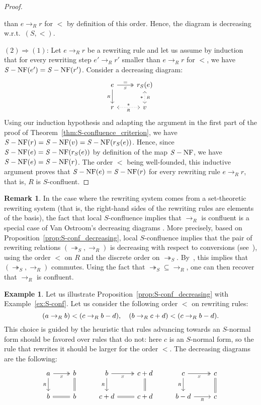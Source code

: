 \documentclass[10pt]{easychair}
\theoremstyle{definition}
\newtheorem{remark}[theorem]{Remark}
\newtheorem{example}[theorem]{Example}
\newcommand\rewR{\to_R}
\newcommand\rewS{\twoheadrightarrow_S}
\DeclareMathOperator{\SNF}{{\it S}-NF}
\begin{document}
\begin{proof}
\begin{itemize}
    than $e\rewR r$ for $<$ by definition of this order. Hence, the
    diagram is decreasing w.r.t.\ $(S,<)$.
  \end{itemize}
  $(2)\Rightarrow (1)$: Let $e\rewR r$ be a rewriting rule and let us
  assume by induction that for every rewriting step $e'\rewR r'$ smaller
  than $e\rewR r$ for $<$, we have $\SNF(e')=\SNF(r')$. Consider a
  decreasing diagram:
  \[\begin{tikzcd}
  e\ar[d, "_R"']\ar[r, twoheadrightarrow, "=", "_S"'] &
  r_S(e)\ar[d, leftrightarrow, dotted, "*"', "_R"]\\
  r\ar[r, leftrightarrow, dotted, "*", "_R"'] & v
  \end{tikzcd}\]
  Using our induction hypothesis and adapting the argument in the first
  part of the proof of Theorem~\ref{thm:S-confluence_criterion}, we have
  $\SNF(r)=\SNF(v)=\SNF(r_S(e))$. Hence, since $\SNF(e)=\SNF(r_S(e))$ by
  definition of the map $\SNF$, we have $\SNF(e)=\SNF(r)$. The order
  $<$ being well-founded, this inductive argument proves that
  $\SNF(e)=\SNF(r)$ for every rewriting rule $e\rewR r$, that is, $R$ is
  $S$-confluent.
\end{proof}
\smallskip

\begin{remark}
  In the case where the rewriting system comes from a set-theoretic rewriting
  system (that is, the right-hand sides of the rewriting rules are elements of
  the basis), the fact that local $S$-confluence implies that $\rewR$ is
  confluent is a special case of Van Ostroom's decreasing diagrams
  \cite{van2008confluence}. More precisely, based on
  Proposition~\ref{prop:S-conf_decreasing}, local $S$-confluence implies
  that the pair of rewriting relations $(\rewS,\rewR)$ is decreasing with
  respect to conversions (see~\cite[Definition 3]{van2008confluence}),
  using the order $<$ on $R$ and the discrete order on $\rewS$.
  By~\cite[Theorem 3]{van2008confluence}, this implies that
  $(\rewS,\rewR)$ commutes. Using the fact that $\rewS \subseteq \rewR$,
  one can then recover that $\rewR$ is confluent.
\end{remark}
\smallskip

\begin{example}\label{ex:end_to_example}
  Let us illustrate Proposition~\ref{prop:S-conf_decreasing} with
  Example~\ref{ex:S-conf}. Let us consider the following order $<$ on
  rewriting rules:
  \[(a\rewR b)<(c\rewR b-d),\quad(b\rewR c+d)<(c\rewR b-d).
  \smallskip\]
  This choice is guided by the heuristic that rules advancing towards an
  $S$-normal form should be favored over rules that do not: here $c$ is
  an $S$-normal form, so the rule that rewrites it should be larger for
  the order $<$. The decreasing diagrams are the following:
  \[\begin{tikzcd}
  a\ar[d, "_R"']\ar[r, twoheadrightarrow, "_S"'] &
  b\ar[d, equal] & b\ar[d, "_R"']
  \ar[r, twoheadrightarrow, "_S"'] & c+d\ar[d, equal] &
  c\ar[d, "_R"']\ar[r, twoheadrightarrow, "_S"'] & c\ar[d,equal]\\
  b\ar[r, equal] & b & c+d\ar[r, equal] & c+d & b-d\ar[r,  "_R"'] & c
  \end{tikzcd}\]
\end{example}
\smallskip
\end{document}
